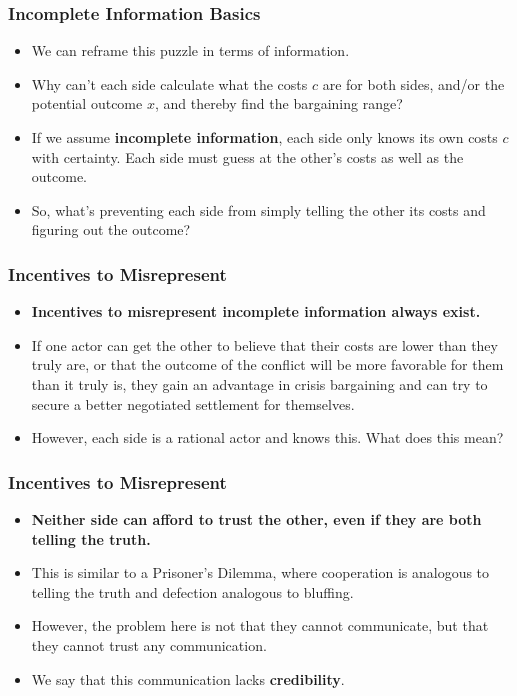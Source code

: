 \documentclass{beamer}
\begin{document}
\begin{frame} 
	\frametitle{\LARGE{Incomplete Information Basics}}
	\begin{itemize}
		\item We can reframe this puzzle in terms of information. \pause
		\item Why can't each side calculate what the costs $c$ are for both sides, and/or the potential outcome $x$, and thereby find the bargaining range? \pause
		\item If we assume \textbf{incomplete information}, each side only knows its own costs $c$ with certainty. Each side must guess at the other's costs as well as the outcome. \pause
		\item So, what's preventing each side from simply telling the other its costs and figuring out the outcome?
	\end{itemize}
\end{frame}

\begin{frame} 
	\frametitle{\LARGE{Incentives to Misrepresent}}
	\begin{itemize}
		\item \textbf{Incentives to misrepresent incomplete information always exist.} \pause
		\item If one actor can get the other to believe that their costs are lower than they truly are, or that the outcome of the conflict will be more favorable for them than it truly is, they gain an advantage in crisis bargaining and can try to secure a better negotiated settlement for themselves. \pause
		\item However, each side is a rational actor and knows this. What does this mean?		
	\end{itemize}
\end{frame}

\begin{frame} 
	\frametitle{\LARGE{Incentives to Misrepresent}}
	\begin{itemize}
		\item \textbf{Neither side can afford to trust the other, even if they are both telling the truth.} \pause
		\item This is similar to a Prisoner's Dilemma, where cooperation is analogous to telling the truth and defection analogous to bluffing. \pause
		\item However, the problem here is not that they cannot communicate, but that they cannot trust any communication.	 \pause
		\item We say that this communication lacks \textbf{credibility}.
	\end{itemize}
\end{frame}
\end{document}
